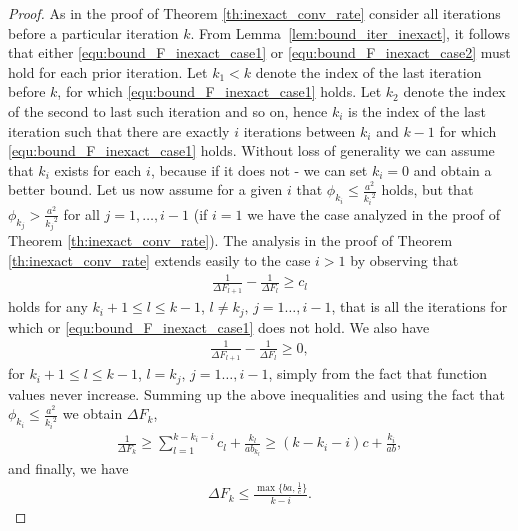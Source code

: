 \documentclass[11pt]{article}
\numberwithin{equation}{section}
\begin{document}
\begin{proof}
As in  the proof of Theorem \ref{th:inexact_conv_rate} consider all iterations before a particular iteration $k$.  From Lemma~\ref{lem:bound_iter_inexact}, it follows that either \eqref{equ:bound_F_inexact_case1} or \eqref{equ:bound_F_inexact_case2} must hold for each prior iteration. 
       Let $k_1 <k$  denote the index of the last iteration before $k$,  for which \eqref{equ:bound_F_inexact_case1} holds. Let $k_2$ denote the index of the second to last such iteration and so on, hence $k_i$ is the index of the last iteration such that there are exactly $i$ iterations between $k_i$ and 
       $k-1$ for which \eqref{equ:bound_F_inexact_case1} holds. Without loss of generality we can assume that $k_i$ exists for each $i$, because if it does not - we can set $k_i=0$ and obtain a better bound. 
       Let us now assume for a given $i$ that $\phi_{k_i} \leq \frac{a^2}{{k_i}^2}$ holds, but that $\phi_{k_j} > \frac{a^2}{{k_j}^2}$ for all $j=1,\ldots, i-1$ (if $i=1$ we have the case analyzed in the proof of Theorem \ref{th:inexact_conv_rate}). The analysis in the proof of Theorem \ref{th:inexact_conv_rate} extends 
       easily to the case  $i>1$ by observing that 
       \begin{align*}
	    \frac{1}{\Delta F_{l+1}} - \frac{1}{\Delta F_{l}} \geq c_l
	\end{align*}
	holds for any $k_i+1\leq l\leq k-1$, $l\neq k_j,\, j=1\ldots, i-1$, that is all the iterations for which  or \eqref{equ:bound_F_inexact_case1} does not hold. 
	We also have
	 \begin{align*}
	    \frac{1}{\Delta F_{l+1}} - \frac{1}{\Delta F_{l}} \geq 0, 
	\end{align*}
	for $k_i+1\leq l\leq k-1$, $l= k_j,\, j=1\ldots, i-1$, simply from the fact that function values never increase. 
	Summing up the above inequalities  and using the fact that $\phi_{k_i} \leq \frac{a^2}{{k_i}^2}$ we obtain 
	$\Delta F_{k}$, 
	\begin{align}\label{eq:finalsum}
	    \frac{1}{\Delta F_{k }} \geq    
	    \sum_{l=1}^{k-k_i-i}c_l+ \frac{k_l} {a b_{k_l} }\geq   (k-k_i-i)c+ \frac{k_i} {a b },
	\end{align}
	and finally, we have 
		\begin{align}\label{eq:finalsum}
	    \Delta F_{k } \leq    \frac{\max\{ba, \frac{1}{c}\}}{k-i}. 
	\end{align}


\end{proof}
\end{document}
